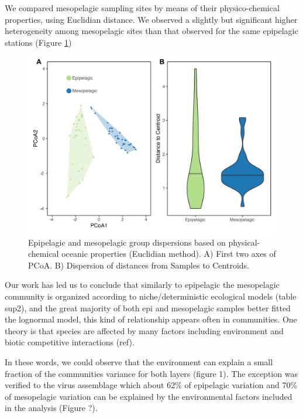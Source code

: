 \documentclass[fleqn,10pt]{wlscirep}
\begin{document}
We compared mesopelagic sampling sites by means of their physico-chemical properties, using Euclidian distance. We observed a slightly but significant higher heterogeneity among mesopelagic sites than that observed for the same epipelagic stations (Figure \ref{fig:betadipersion})

\begin{figure}[ht]
    \centering
    \includegraphics[scale=0.5]{images/betadisp_diganose_to_print.pdf}
    \caption{Epipelagic and mesopelagic group dispersions based on physical-chemical oceanic properties (Euclidian method). A) First two axes of PCoA. B) Dispersion of distances from Samples to Centroids.}
    \label{fig:betadipersion}
\end{figure}

Our work has led us to conclude that similarly to epipelagic the mesopelagic community is organized according to niche/deterministic ecological models (table sup2), and the great majority of both epi and mesopelagic samples better fitted the lognormal model, this kind of relationship appears often in communities. One theory is that species are affected by many factors including environment and biotic competitive interactions (ref). 

In these words, we could observe that the environment can explain a small fraction of the communities variance for both layers (figure 1). The exception was verified to the virus assemblage which about 62\% of epipelagic variation and 70\% of mesopelagic variation can be explained by the environmental factors included in the analysis (Figure ?). 
\end{document}
